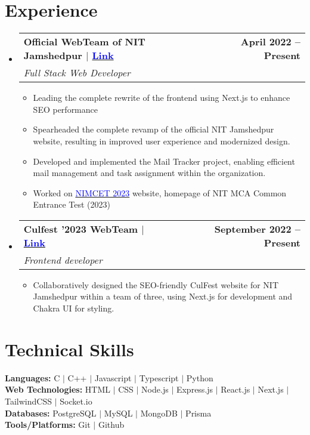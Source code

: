 \documentclass[letterpaper,11pt]{article}
\makeatletter
\newcommand{\resumeItem}[1]{
\item\large{
{#1 \vspace{-2pt}}
}
}
\newcommand{\resumeSubheading}[4]{
\vspace{-2pt}\item
\begin{tabular*}{1.0\textwidth}[t]{l@{\extracolsep{\fill}}r}
\textbf{#1} & \textbf{\normalsize #2} \\
\textit{\normalsize#3} & \textit{\normalsize #4} \\
\end{tabular*}\vspace{-7pt}
}
\newcommand{\resumeSubHeadingListStart}{\begin{itemize}[leftmargin=0.0in, label={}]}
\newcommand{\resumeSubHeadingListEnd}{\end{itemize}}
\newcommand{\resumeItemListStart}{\begin{itemize}}
\newcommand{\resumeItemListEnd}{\end{itemize}\vspace{-5pt}}
\makeatother
\begin{document}
\section{Experience}
\resumeSubHeadingListStart
\resumeSubheading
{Official WebTeam of NIT Jamshedpur $|$ \href{https://nijsr.ac.in}{\textcolor{blue}{Link}}}{April 2022 -- Present}
{Full Stack Web Developer}{}
\resumeItemListStart
\resumeItem{Leading the complete rewrite of the frontend using Next.js to enhance SEO performance}
\resumeItem{Spearheaded the complete revamp of the official NIT Jamshedpur website, resulting in improved user experience and modernized design.}
\resumeItem{Developed and implemented the Mail Tracker project, enabling efficient mail management and task assignment within the organization.}
\resumeItem{Worked on \href{http://nimcet.in}{\textcolor{blue}{NIMCET 2023}} website, homepage of NIT MCA Common Entrance Test (2023)}
\resumeItemListEnd
\resumeSubheading
{Culfest '2023 WebTeam $|$ \href{https://culfest.in}{\textcolor{blue}{Link}}}{September 2022 -- Present}
{Frontend developer}{}
\resumeItemListStart
\resumeItem{Collaboratively designed the SEO-friendly CulFest website for NIT Jamshedpur within a team of three, using Next.js for development and Chakra UI for styling.}
\resumeItemListEnd
\resumeSubHeadingListEnd
\vspace{-13pt}

\section{Technical Skills}
\begin{itemize}[leftmargin=0.15in, label={}]
\small{\item{
\textbf{Languages: }{C $|$ C++ $|$ Javascript $|$ Typescript $|$ Python} \\
\vspace{1pt}
\vspace{1pt}
\textbf{Web Technologies: }{HTML $|$ CSS $|$ Node.js $|$ Express.js $|$ React.js $|$ Next.js $|$ TailwindCSS $|$ Socket.io } \\
\vspace{1pt}
\textbf{Databases: }{PostgreSQL $|$ MySQL $|$ MongoDB $|$ Prisma} \\
\vspace{1pt}
\textbf{Tools/Platforms: }{Git $|$ Github} \\
}}
\end{itemize}
\end{document}
